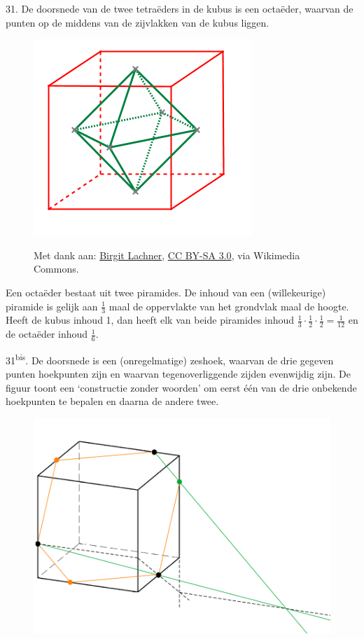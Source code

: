\begin{problem}{31.}
    De doorsnede van de twee tetraëders in de kubus is een octaëder, waarvan de punten op de middens van de zijvlakken van de kubus liggen.
    \begin{figure}
        \includegraphics[scale=0.35]{resources/Octahedron_in_Cube}

        \scriptsize{Met dank aan: \href{https://commons.wikimedia.org/wiki/File:Octahedron_in_Cube.png?uselang=nl}{Birgit Lachner}, \href{http://creativecommons.org/licenses/by-sa/3.0/}{CC BY-SA 3.0}, via Wikimedia Commons.}
    \end{figure}
    Een octaëder bestaat uit twee piramides. De inhoud van een (wil\-lekeurige) piramide is gelijk aan $\frac{1}{3}$ maal de oppervlakte van het grond\-vlak maal de hoogte. Heeft de kubus inhoud 1, dan heeft elk van beide piramides inhoud $\frac{1}{3} \cdot \frac{1}{2} \cdot \frac{1}{2} = \frac{1}{12}$ en de octaëder inhoud $\frac{1}{6}$.
\end{problem}

\clearpage

\begin{problem}{31\textsuperscript{bis}.}
	De doorsnede is een (onregelmatige) zeshoek, waarvan de drie gegeven punten hoekpunten zijn en waarvan tegenoverliggende zijden evenwijdig zijn. De figuur toont een `constructie zonder woorden' om eerst één van de drie onbekende hoekpunten te bepalen en daarna de andere twee.
    \begin{figure}
        \includegraphics[scale=0.2]{resources/oplossing31bis}
    \end{figure}
\end{problem}

